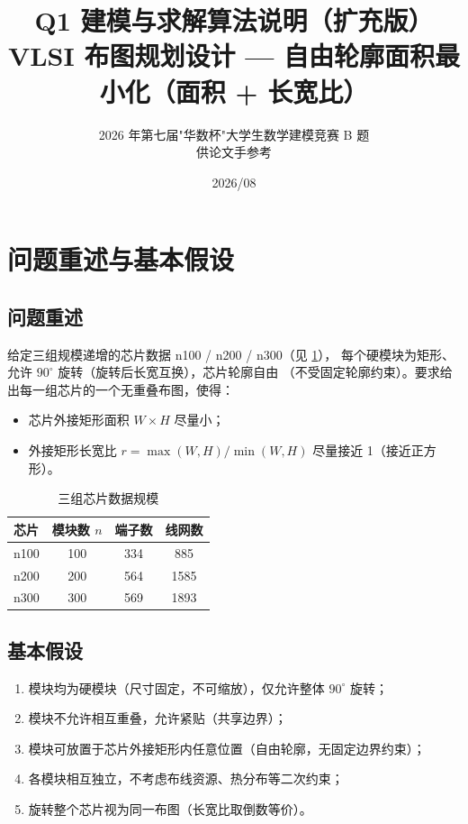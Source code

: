 \documentclass[12pt,a4paper]{article}
\title{\textbf{Q1 建模与求解算法说明（扩充版）}\\[6pt]
\large VLSI 布图规划设计 --- 自由轮廓面积最小化（面积 + 长宽比）}
\author{2026 年第七届"华数杯"大学生数学建模竞赛 B 题 \\ 供论文手参考}
\date{2026/08}
\begin{document}
\maketitle
\tableofcontents
\newpage

\section{问题重述与基本假设}

\subsection{问题重述}

给定三组规模递增的芯片数据 n100 / n200 / n300（见 \ref{tab:scale}），
每个硬模块为矩形、允许 $90^\circ$ 旋转（旋转后长宽互换），芯片轮廓自由
（不受固定轮廓约束）。要求给出每一组芯片的一个无重叠布图，使得：

\begin{itemize}
    \item 芯片外接矩形面积 $W \times H$ 尽量小；
    \item 外接矩形长宽比 $r = \max(W,H)/\min(W,H)$ 尽量接近 1（接近正方形）。
\end{itemize}

\begin{table}[H]
\centering
\caption{三组芯片数据规模}\label{tab:scale}
\begin{tabular}{lccc}
\toprule
芯片 & 模块数 $n$ & 端子数 & 线网数 \\
\midrule
n100 & 100 & 334 & 885 \\
n200 & 200 & 564 & 1585 \\
n300 & 300 & 569 & 1893 \\
\bottomrule
\end{tabular}
\end{table}

\subsection{基本假设}

\begin{enumerate}
    \item 模块均为硬模块（尺寸固定，不可缩放），仅允许整体 $90^\circ$ 旋转；
    \item 模块不允许相互重叠，允许紧贴（共享边界）；
    \item 模块可放置于芯片外接矩形内任意位置（自由轮廓，无固定边界约束）；
    \item 各模块相互独立，不考虑布线资源、热分布等二次约束；
    \item 旋转整个芯片视为同一布图（长宽比取倒数等价）。
\end{enumerate}
\end{document}
